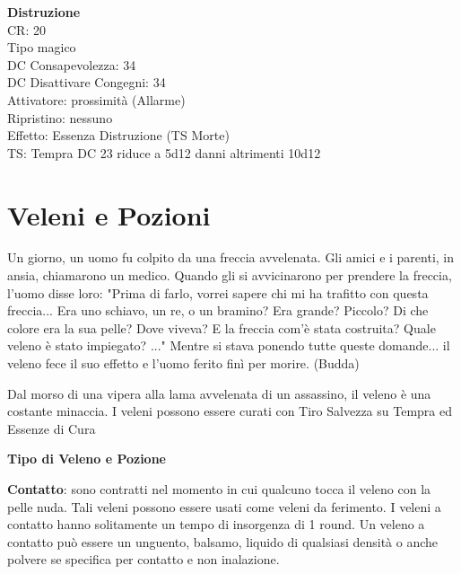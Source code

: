 \documentclass[a4paper,11pt,twoside,openany]{book}
\begin{document}
\begin{multicols}{2}
	\textbf{Distruzione}\\
	CR: 20 \\
	Tipo magico \\
	DC Consapevolezza: 34 \\
	DC Disattivare Congegni: 34 \\
	Attivatore: prossimità (Allarme) \\
	Ripristino: nessuno \\
	Effetto: Essenza Distruzione (TS Morte)\\
	TS: Tempra DC 23 riduce a 5d12 danni altrimenti 10d12\\

\end{multicols}

\pagebreak


\section{Veleni e Pozioni}

\label{veleni-e-pozioni}


\begin{tcolorbox}[enhanced,arc=5pt,boxrule=0.3pt]{Un giorno, un uomo fu colpito da una freccia avvelenata. Gli amici e i parenti, in ansia, chiamarono un medico. Quando gli si avvicinarono per prendere la freccia, l'uomo disse loro: "Prima di farlo, vorrei sapere chi mi ha trafitto con questa freccia... Era uno schiavo, un re, o un bramino? Era grande? Piccolo? Di che colore era la sua pelle? Dove viveva? E la freccia com'è stata costruita? Quale veleno è stato impiegato? ..." Mentre si stava ponendo tutte queste domande... il veleno fece il suo effetto e l'uomo ferito finì per morire. (Budda)}\end{tcolorbox}\medskip


Dal morso di una vipera alla lama avvelenata di un assassino, il veleno è una costante minaccia. I veleni possono essere curati con Tiro Salvezza su Tempra ed Essenze di Cura

\bigskip

\textbf{Tipo di Veleno e Pozione}

\textbf{Contatto}: sono contratti nel momento in cui qualcuno tocca il veleno con la pelle nuda. Tali veleni possono essere usati come veleni da ferimento. I veleni a contatto hanno solitamente un tempo di insorgenza di 1 round. Un veleno a contatto può essere un unguento, balsamo, liquido di qualsiasi densità o anche polvere se specifica per contatto e non inalazione.
\end{document}
